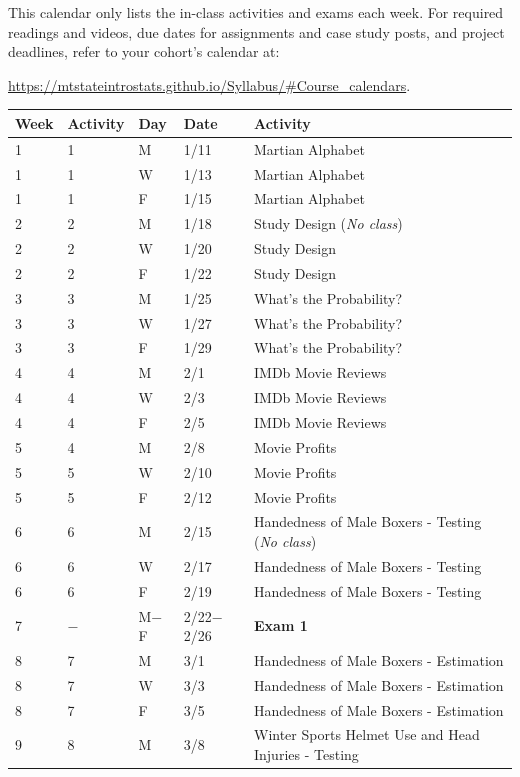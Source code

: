 \documentclass[
]{report}
\begin{document}
This calendar only lists the in-class activities and exams each week. For required readings and videos, due dates for assignments and case study posts, and project deadlines, refer to your cohort's calendar at:

\url{https://mtstateintrostats.github.io/Syllabus/\#Course_calendars}.

\begin{longtable}{|l|l|l|l|p{}|}
\hline
\textbf{Week}& \textbf{Activity}& \textbf{Day}& \textbf{Date}& \textbf{Activity} \\ \hline
\endhead
1& 1& M& 1/11& Martian Alphabet \\*
1& 1& W& 1/13& Martian Alphabet \\*
1& 1& F& 1/15& Martian Alphabet \\ \hline
2& 2& M& 1/18& Study Design (\textit{No class}) \\*
2& 2& W& 1/20& Study Design \\*
2& 2& F& 1/22& Study Design \\ \hline
3& 3& M& 1/25& What's the Probability? \\*
3& 3& W& 1/27& What's the Probability? \\*
3& 3& F& 1/29& What's the Probability? \\ \hline
4& 4& M& 2/1& IMDb Movie Reviews \\*
4& 4& W& 2/3& IMDb Movie Reviews \\*
4& 4& F& 2/5& IMDb Movie Reviews \\ \hline
5& 4& M& 2/8& Movie Profits \\*
5& 5& W& 2/10& Movie Profits \\*    
5& 5& F& 2/12& Movie Profits \\ \hline
6& 6& M& 2/15& Handedness of Male Boxers - Testing (\textit{No class})\\*
6& 6& W& 2/17& Handedness of Male Boxers - Testing \\*  
6& 6& F& 2/19& Handedness of Male Boxers - Testing \\ \hline
7& $-$& M$-$F& 2/22$-$2/26& \textbf{Exam 1} \\ \hline
8& 7& M& 3/1& Handedness of Male Boxers - Estimation \\*
8& 7& W& 3/3& Handedness of Male Boxers - Estimation \\*    
8& 7& F& 3/5& Handedness of Male Boxers - Estimation \\ \hline
9& 8& M& 3/8& Winter Sports Helmet Use and Head Injuries - Testing \\*

\end{longtable}
\end{document}
